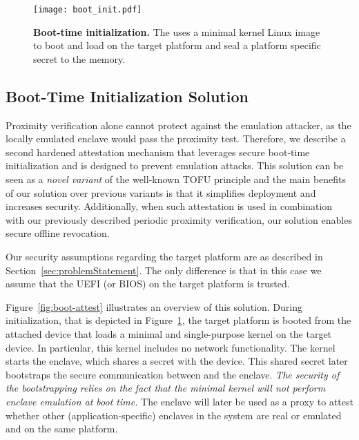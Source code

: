 \begin{figure}[t]
 \centering
    \texttt{[image: boot\_init.pdf]}
 \caption{\textbf{Boot-time initialization.} The \device uses a minimal kernel Linux image to boot and load \nameclave on the target platform and seal a platform specific secret to the \device memory.}
\figsaver
 \label{fig:boot-init}
\end{figure}



\subsection{Boot-Time Initialization Solution}

Proximity verification alone cannot protect against the emulation attacker, as the locally emulated enclave would pass the proximity test. 
%
Therefore, we describe a second hardened attestation mechanism that leverages secure boot-time initialization and is designed to prevent emulation attacks. This solution can be seen as a \emph{novel variant} of the well-known TOFU principle and the main benefits of our solution over previous variants is that it simplifies deployment and increases security. Additionally, when such attestation is used in combination with our previously described periodic proximity verification, our solution enables secure offline revocation.


Our security assumptions regarding the target platform are as described in Section~\ref{sec:problemStatement}. The only difference is that in this case we assume that the UEFI (or BIOS) on the target platform is trusted.


Figure~\ref{fig:boot-attest} illustrates an overview of this solution. During initialization, that is depicted in Figure~\ref{fig:boot-init}, the target platform is booted from the attached device that loads a minimal and single-purpose \name kernel on the target device. In particular, this kernel includes no network functionality. The kernel starts the \name enclave, which shares a secret with the device. This shared secret later bootstraps the secure communication between \device and the \name enclave. \emph{The security of the bootstrapping relies on the fact that the minimal kernel will not perform enclave emulation at boot time.} The \name enclave will later be used as a proxy to attest whether other (application-specific) enclaves in the system are real or emulated and on the same platform.


